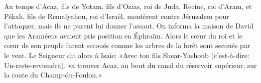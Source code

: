 Au temps d’Acaz, fils de Yotam, fils d’Ozias, roi de Juda,
	Recine, roi d’Aram, et Pékah, fils de Remalyahou, roi d’Israël,
		montèrent contre Jérusalem pour l’attaquer,
	mais ils ne purent lui donner l’assaut.
On informa la maison de David que les Araméens avaient pris position en Éphraïm.
Alors le cœur du roi et le cœur de son peuple furent secoués
	comme les arbres de la forêt sont secoués par le vent.
Le Seigneur dit alors à Isaïe:
	«Avec ton fils Shear-Yashoub (c’est-à-dire: Un-reste-reviendra),
	va trouver Acaz, au bout du canal du réservoir supérieur,
	sur la route du Champ-du-Foulon.»
